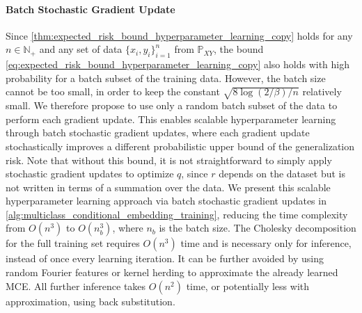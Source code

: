 \documentclass{llncs}
\begin{document}
	\paragraph{Batch Stochastic Gradient Update} Since \cref{thm:expected_risk_bound_hyperparameter_learning_copy} holds for any $n \in \mathbb{N}_{+}$ and any set of data $\{x_{i}, y_{i}\}_{i = 1}^{n}$ from $\mathbb{P}_{X Y}$, the bound \eqref{eq:expected_risk_bound_hyperparameter_learning_copy} also holds with high probability for a batch subset of the training data. However, the batch size cannot be too small, in order to keep the constant $\sqrt{8 \log{(2 / \beta)} / n}$ relatively small. We therefore propose to use only a random batch subset of the data to perform each gradient update. This enables scalable hyperparameter learning through batch stochastic gradient updates, where each gradient update stochastically improves a different probabilistic upper bound of the generalization risk. Note that without this bound, it is not straightforward to simply apply stochastic gradient updates to optimize $q$, since $r$ depends on the dataset but is not written in terms of a summation over the data. We present this scalable hyperparameter learning approach via batch stochastic gradient updates in \cref{alg:multiclass_conditional_embedding_training}, reducing the time complexity from $O(n^{3})$ to $O(n_{b}^{3})$, where $n_{b}$ is the batch size. The Cholesky decomposition for the full training set requires $O(n^{3})$ time and is necessary only for inference, instead of once every learning iteration. It can be further avoided by using random Fourier features \citep{rahimi2008random} or kernel herding \citep{chen2010super} to approximate the already learned \gls{MCE}. All further inference takes $O(n^{2})$ time, or potentially less with approximation, using back substitution. 
	
\end{document}
